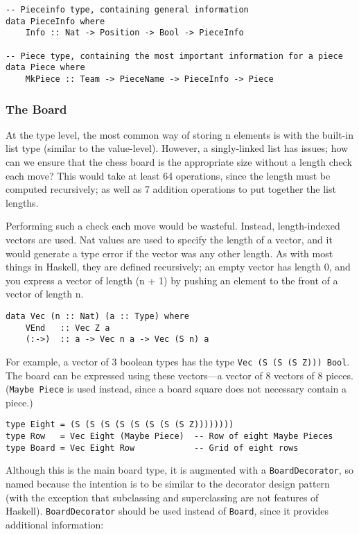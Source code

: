 \documentclass[12pt, a4paper]{scrartcl}
\begin{document}
\begin{lstlisting}
-- Pieceinfo type, containing general information
data PieceInfo where
    Info :: Nat -> Position -> Bool -> PieceInfo

-- Piece type, containing the most important information for a piece
data Piece where
    MkPiece :: Team -> PieceName -> PieceInfo -> Piece
\end{lstlisting}

\subsubsection{The Board}

At the type level, the most common way of storing n elements is with the built-in list type (similar to the value-level). However, a singly-linked list has issues; how can we ensure that the chess board is the appropriate size without a length check each move? This would take at least 64 operations, since the length must be computed recursively; as well as 7 addition operations to put together the list lengths.

Performing such a check each move would be wasteful. Instead, length-indexed vectors are used. Nat values are used to specify the length of a vector, and it would generate a type error if the vector was any other length. As with most things in Haskell, they are defined recursively; an empty vector has length 0, and you express a vector of length (n + 1) by pushing an element to the front of a vector of length n.

\begin{lstlisting}
data Vec (n :: Nat) (a :: Type) where
    VEnd   :: Vec Z a
    (:->)  :: a -> Vec n a -> Vec (S n) a
\end{lstlisting}

For example, a vector of 3 boolean types has the type \lstinline{Vec (S (S (S Z))) Bool}. The board can be expressed using these vectors---a vector of 8 vectors of 8 pieces. (\lstinline{Maybe Piece} is used instead, since a board square does not necessary contain a piece.)

\begin{lstlisting}
type Eight = (S (S (S (S (S (S (S (S Z))))))))
type Row   = Vec Eight (Maybe Piece)  -- Row of eight Maybe Pieces
type Board = Vec Eight Row            -- Grid of eight rows
\end{lstlisting}

Although this is the main board type, it is augmented with a \lstinline{BoardDecorator}, so named because the intention is to be similar to the decorator design pattern\cite{decorator} (with the exception that subclassing and superclassing are not features of Haskell). \lstinline{BoardDecorator} should be used instead of \lstinline{Board}, since it provides additional information:
\end{document}
